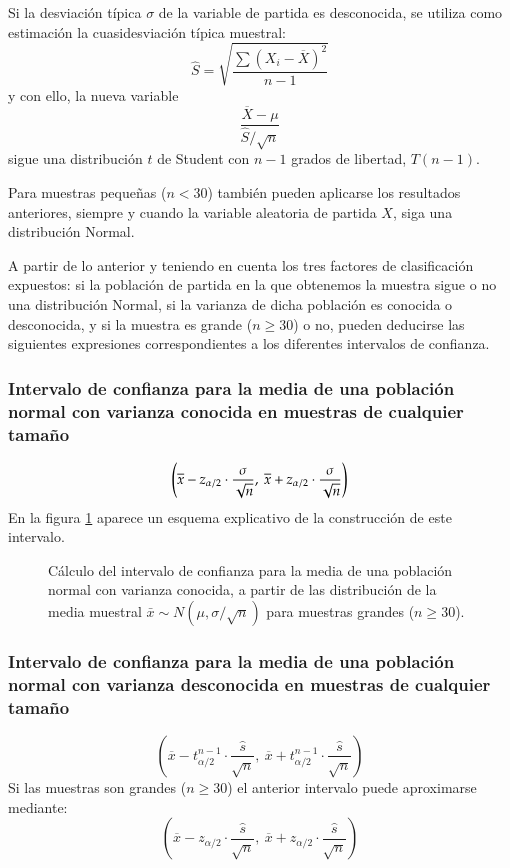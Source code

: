 Si la desviación típica $\sigma$ de la variable de partida es desconocida, se utiliza como estimación la cuasidesviación
típica muestral: \[ \hat S=\sqrt{\dfrac{\sum \left( X_{i}-\overline{X}\right) ^{2}}{n-1}} \] y con ello, la nueva
variable \[
\dfrac{\overline{X}-\mu }{\hat S/\sqrt{n}}
\] sigue una distribución $t$ de Student con $n-1$ grados de libertad, $T(n-1)$.

Para muestras pequeñas ($n<30$) también pueden aplicarse los resultados anteriores, siempre y cuando la variable
aleatoria de partida $X$, siga una distribución Normal.

A partir de lo anterior y teniendo en cuenta los tres factores de clasificación expuestos: si la población de partida en
la que obtenemos la muestra sigue o no una distribución Normal, si la varianza de dicha población es conocida o
desconocida, y si la muestra es grande ($n\geq30$) o no, pueden deducirse las siguientes expresiones correspondientes a
los diferentes intervalos de confianza.

\subsubsection{Intervalo de confianza para la media de una población normal con varianza conocida en muestras de
cualquier tamaño}
\[
\left( \overline{x}-z_{\alpha /2}\cdot \dfrac{\sigma }{\sqrt{n}},\ \overline{%
x}+z_{\alpha /2}\cdot \dfrac{\sigma }{\sqrt{n}}\right)
\]
En la figura \ref{g:intervalomedia} aparece un esquema explicativo de la construcción de este intervalo.
\begin{figure}[h!]
\begin{center}
\scalebox{0.8}{}
\caption{Cálculo del intervalo de confianza para la media de una población
normal con varianza conocida, a partir de las distribución de la media muestral $\bar x\sim N(\mu,\sigma/\sqrt n)$ para muestras grandes ($n\geq 30$).} \label{g:intervalomedia}
\end{center}
\end{figure}


\subsubsection{Intervalo de confianza para la media de una población normal con varianza desconocida en muestras de
cualquier tamaño} 
\[ \left( \overline{x}-t_{\alpha /2}^{n-1}\cdot \dfrac{\hat s}{\sqrt{n}},\ \overline{x}+t_{\alpha
/2}^{n-1}\cdot \dfrac{\hat s}{\sqrt{n}}\right) 
\]
Si las muestras son grandes ($n\geq30$) el anterior intervalo puede aproximarse mediante:
\[
\left( \overline{x}-z_{\alpha /2}\cdot \dfrac{\hat s}{\sqrt{n}},\  \overline{x}+z_{\alpha /2}\cdot
\dfrac{\hat s}{\sqrt{n}}\right)
\]


